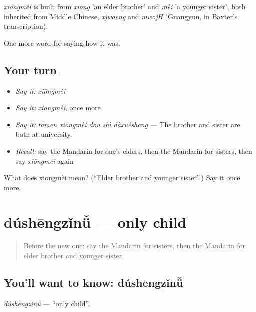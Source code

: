 \begin{cousinweb}
\emph{xiōngmèi} is built from \emph{xiōng} 'an elder brother' and \emph{mèi} 'a younger sister', both inherited from Middle Chinese, \emph{xjwaeng} and \emph{mwojH} (Guangyun, in Baxter's transcription).
\end{cousinweb}

\begin{grammarlens}[title={What you've built}]
One more word for saying how it was.
\end{grammarlens}

\subsection*{Your turn}
\begin{itemize}
\raggedright
  \item \emph{Say it:} \emph{xiōngmèi}
  \item \emph{Say it:} \emph{xiōngmèi}, once more
  \item \emph{Say it:} \emph{tāmen xiōngmèi dōu shì dàxuésheng} — The brother and sister are both at university.
  \item \emph{Recall:} say the Mandarin for one's elders, then the Mandarin for sisters, then say \emph{xiōngmèi} again
\end{itemize}

\begin{tcolorbox}[breakable,colback=teal!4,colframe=teal!35!black,title={Before you move on}]
What does xiōngmèi mean? (\textquotedblleft{}Elder brother and younger sister\textquotedblright{}.) Say it once more.
\end{tcolorbox}
\section[dúshēngzǐnǚ]{dúshēngzǐnǚ — only child}

\label{lesson:ZH-C508-dushengzinu}



\begin{quote}
Before the new one: say the Mandarin for sisters, then the Mandarin for elder brother and younger sister.
\end{quote}

\subsection*{You'll want to know: dúshēngzǐnǚ}
\emph{dúshēngzǐnǚ} — \textquotedblleft{}only child\textquotedblright{}.

